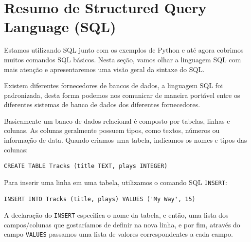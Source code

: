 \section{Resumo de Structured Query Language (SQL)}


Estamos utilizando SQL junto com os exemplos de Python e até agora cobrimos
muitos comandos SQL básicos. Nesta seção, vamos olhar a linguagem SQL com
mais atenção e apresentaremos uma visão geral da sintaxe do SQL.


Existem diferentes fornecedores de bancos de dados, a linguagem SQL foi
padronizada, desta forma podemos nos comunicar de maneira portável entre os
diferentes sistemas de banco de dados dos diferentes fornecedores.


Basicamente um banco de dados relacional é composto por tabelas, linhas e
colunas. As colunas geralmente possuem tipos, como textos, números ou
informação de data. Quando criamos uma tabela, indicamos os nomes e tipos das
colunas:

\beforeverb
\begin{verbatim}
CREATE TABLE Tracks (title TEXT, plays INTEGER)
\end{verbatim}
\afterverb
%
%
Para inserir uma linha em uma tabela, utilizamos o comando SQL {\tt INSERT}:

\beforeverb
\begin{verbatim}
INSERT INTO Tracks (title, plays) VALUES ('My Way', 15)
\end{verbatim}
\afterverb
%
%
A declaração do {\tt INSERT} especifica o nome da tabela, e então, uma lista
dos campos/colunas que gostaríamos de definir na nova linha, e por fim,
através do campo {\tt VALUES} passamos uma lista de valores correspondentes a
cada campo.

